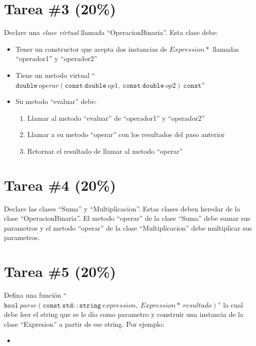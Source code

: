 \documentclass{article}
\newcommand{\perlscript}[2]{
\begin{itemize}
\item[]
\end{itemize}
}
\begin{document}
\section*{Tarea \#3 (20\%)}

Declare una \emph{clase virtual} llamada ``OperacionBinaria''. Esta clase debe:
\begin{itemize}
        \item{Tener un constructor que acepta dos instancias de $Expression*$ llamadas
        ``operador1'' y ``operador2''}
        \item{Tiene un metodo virtual ``$\mathtt{double}\ operar(\mathtt{const\ double}\ op1,\ \mathtt{const\ double}\ op2)\ \mathtt{const}$''}
        \item{Su metodo ``evaluar'' debe:
                \begin{enumerate}
                        \item{Llamar al metodo ``evaluar'' de ``operador1'' y ``operador2''}
                        \item{Llamar a su metodo ``operar'' con los resultados del paso anterior}
                        \item{Retornar el resultado de llamar al metodo ``operar''}
                \end{enumerate} 
        }
\end{itemize}

\section*{Tarea \#4 (20\%)}
Declare las clases ``Suma'' y ``Multiplicacion''. Estas clases deben heredar de
la clase ``OperacionBinaria''. El metodo ``operar'' de la clase ``Suma'' debe
sumar sus parametros y el metodo ``operar'' de la clase ``Multiplicacion'' debe
multiplicar sus parametros.

\section*{Tarea \#5 (20\%)}
Defina una funci\'on ``$\mathtt{bool}\ parse(\mathtt{const\ std::string}\ expression,\ Expression*\ resultado)$'' la
cual debe leer el string que se le dio como parametro y construir una instancia de la clase ``Expresion''
a partir de ese string. Por ejemplo:

\perlscript{parse.cc}{}
\end{document}
